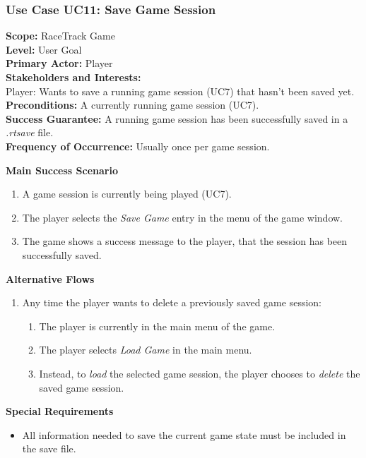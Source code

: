 		\subsubsection{Use Case UC11: Save Game Session}
			\textbf{Scope:} RaceTrack Game \\
			\textbf{Level:} User Goal \\
			\textbf{Primary Actor:} Player \\
			\textbf{Stakeholders and Interests:} \\
			Player: Wants to save a running game session (UC7) that hasn't been saved yet. \\
			\textbf{Preconditions:} A currently running game session (UC7). \\
			\textbf{Success Guarantee:} A running game session has been successfully saved in a \textit{.rtsave} file. \\
			\textbf{Frequency of Occurrence:} Usually once per game session.
			\newline
		
			\textbf{Main Success Scenario}
				\begin{enumerate}
					\item A game session is currently being played (UC7).
					\item The player selects the \textit{Save Game} entry in the menu of the game window.
					\item The game shows a success message to the player, that the session has been successfully saved.
				\end{enumerate}
		
			\textbf{Alternative Flows}
				\begin{enumerate}
					\item Any time the player wants to delete a previously saved game session:
					\begin{enumerate}
						\item The player is currently in the main menu of the game.
						\item The player selects \textit{Load Game} in the main menu.
						\item Instead, to \textit{load} the selected game session, the player chooses to \textit{delete} the saved game session.
					\end{enumerate}
				\end{enumerate}
		
			\textbf{Special Requirements}
				\begin{itemize}
					\item All information needed to save the current game state must be included in the save file.
				\end{itemize}
		
